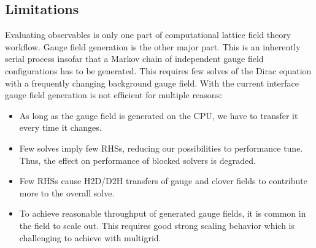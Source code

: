 \subsection{Limitations}

Evaluating observables is only one part of computational lattice field theory workflow.
Gauge field generation is the other major part.
This is an inherently serial process insofar that a Markov chain of independent gauge field configurations has to be generated.
This requires few solves of the Dirac equation with a frequently changing background gauge field.
With the current interface gauge field generation is not efficient for multiple reasons:
\begin{itemize}
    \item As long as the gauge field is generated on the CPU, we have to transfer it every time it changes.
    \item Few solves imply few RHSs, reducing our possibilities to performance tune. Thus, the effect on performance of blocked solvers is degraded.
    \item Few RHSs cause H2D/D2H transfers of gauge and clover fields to contribute more to the overall solve.
    \item To achieve reasonable throughput of generated gauge fields, it is common in the field to scale out. This requires good strong scaling behavior which is challenging to achieve with multigrid.
\end{itemize}




